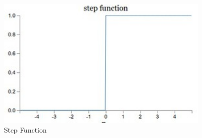 \begin{figure}[h!]
\centering
\includegraphics[height=2.5in, keepaspectratio=true]{step.jpg}
\caption{Step Function}
\end{figure}\\

